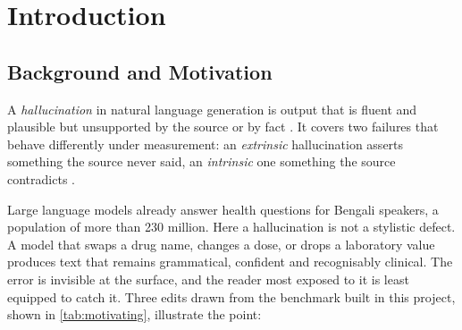 \documentclass{iutbscthesis}
\begin{document}
\newpage

\begin{abstract}
Large language models increasingly answer health questions in Bengali, a language spoken by more than 230 million people but poorly served by clinical language resources. When such a model substitutes one medicine for another or softens a reported test value, the output stays fluent and confident, and nothing on the surface marks it as wrong. No benchmark measured whether a model can separate faithful Bengali medical text from corrupted text. This project builds one. Rather than annotating hallucinations found in model output, we manufacture them: authentic Bengali clinical text is edited under programmatic control, so the gold label is an output of the construction pipeline rather than a human judgement about it. The benchmark spans four task formats --- entity swapping, answer pairing, question-premise corruption, and source corruption for summarization --- yielding 19,396 labelled items and 104,502 detector judgements across six large language models. The results show a sharp asymmetry: detectors reach 94--100\% accuracy on faithful text but between 11\% and 95\% recall on corrupted text. Failure is structured, tracking both the clinical entity type swapped and the corruption operation applied, which makes the benchmark diagnostic rather than merely comparative.
\end{abstract}


\chapter{Introduction}

\section{Background and Motivation}

A \emph{hallucination} in natural language generation is output that is fluent and plausible but unsupported by the source or by fact \parencite{ji2023survey}. It covers two failures that behave differently under measurement: an \emph{extrinsic} hallucination asserts something the source never said, an \emph{intrinsic} one something the source contradicts \parencite{maynez2020faithfulness}.

Large language models already answer health questions for Bengali speakers, a population of more than 230 million. Here a hallucination is not a stylistic defect. A model that swaps a drug name, changes a dose, or drops a laboratory value produces text that remains grammatical, confident and recognisably clinical. The error is invisible at the surface, and the reader most exposed to it is least equipped to catch it. Three edits drawn from the benchmark built in this project, shown in \autoref{tab:motivating}, illustrate the point:
\end{document}
